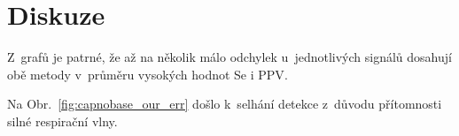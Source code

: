 \chapter{Diskuze} %
\label{ch:diskuze}

Z~grafů je patrné, že až na několik málo odchylek u~jednotlivých signálů dosahují obě metody v~průměru vysokých hodnot \acs{Se} i \acs{PPV}.

Na Obr.~\ref{fig:capnobase_our_err} došlo k~selhání detekce z~důvodu přítomnosti silné respirační vlny.


